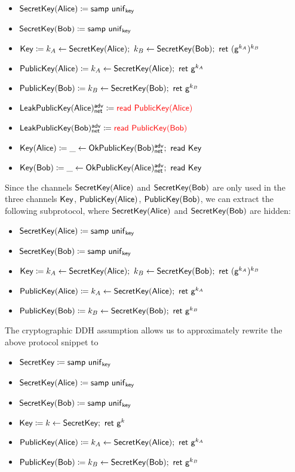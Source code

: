 \begin{itemize}
\item $\mathsf{SecretKey}(\mathsf{Alice}) \coloneqq \mathsf{samp} \ \mathsf{unif}_{\mathsf{key}}$
\item $\mathsf{SecretKey}(\mathsf{Bob}) \coloneqq \mathsf{samp} \ \mathsf{unif}_{\mathsf{key}}$
\item $\Key \coloneqq k_A \leftarrow \SecretKey(\Alice); \ k_B \leftarrow \SecretKey(\Bob); \ \ret{(\gen^{k_A})^{k_B}}$
\item {\color{red} $\PublicKey(\Alice) \coloneqq k_A \leftarrow \SecretKey(\Alice); \ \ret{\gen^{k_A}}$}
\item {\color{red} $\mathsf{PublicKey}(\mathsf{Bob}) \coloneqq k_B \leftarrow \mathsf{SecretKey}(\mathsf{Bob}); \ \mathsf{ret} \ \mathsf{g}^{k_B}$}
\item $\mathsf{LeakPublicKey}(\mathsf{Alice})^{\mathsf{adv}}_{\mathsf{net}} \coloneqq {\color{red} \mathsf{read} \ \mathsf{PublicKey}(\mathsf{Alice})}$
\item $\mathsf{LeakPublicKey}(\mathsf{Bob})^{\mathsf{adv}}_{\mathsf{net}} \coloneqq {\color{red} \mathsf{read} \ \mathsf{PublicKey}(\mathsf{Bob})}$
\item $\mathsf{Key}(\mathsf{Alice}) \coloneqq \_ \leftarrow \mathsf{OkPublicKey}(\mathsf{Bob})^{\mathsf{adv}}_{\mathsf{net}}; \ \mathsf{read} \ \mathsf{Key}$
\item $\mathsf{Key}(\mathsf{Bob}) \coloneqq \_ \leftarrow \mathsf{OkPublicKey}(\mathsf{Alice})^{\mathsf{adv}}_{\mathsf{net}}; \ \mathsf{read} \ \mathsf{Key}$
\end{itemize}

\noindent Since the channels $\mathsf{SecretKey}(\mathsf{Alice})$ and $\mathsf{SecretKey}(\mathsf{Bob})$ are only used in the three channels $\mathsf{Key}$, $\mathsf{PublicKey}(\mathsf{Alice})$, $\mathsf{PublicKey}(\mathsf{Bob})$, we can extract the following subprotocol, where $\mathsf{SecretKey}(\mathsf{Alice})$ and $\mathsf{SecretKey}(\mathsf{Bob})$ are hidden:

\begin{itemize}
\item $\mathsf{SecretKey}(\mathsf{Alice}) \coloneqq \mathsf{samp} \ \mathsf{unif}_{\mathsf{key}}$
\item $\mathsf{SecretKey}(\mathsf{Bob}) \coloneqq \mathsf{samp} \ \mathsf{unif}_{\mathsf{key}}$
\item $\Key \coloneqq k_A \leftarrow \SecretKey(\Alice); \ k_B \leftarrow \SecretKey(\Bob); \ \ret{(\gen^{k_A})^{k_B}}$
\item $\PublicKey(\Alice) \coloneqq k_A \leftarrow \SecretKey(\Alice); \ \ret{\gen^{k_A}}$
\item $\mathsf{PublicKey}(\mathsf{Bob}) \coloneqq k_B \leftarrow \mathsf{SecretKey}(\mathsf{Bob}); \ \mathsf{ret} \ \mathsf{g}^{k_B}$
\end{itemize}

\noindent The cryptographic DDH assumption allows us to approximately rewrite the above protocol snippet to

\begin{itemize}
\item $\mathsf{SecretKey} \coloneqq \mathsf{samp} \ \mathsf{unif}_{\mathsf{key}}$
\item $\mathsf{SecretKey}(\mathsf{Alice}) \coloneqq \mathsf{samp} \ \mathsf{unif}_{\mathsf{key}}$
\item $\mathsf{SecretKey}(\mathsf{Bob}) \coloneqq \mathsf{samp} \ \mathsf{unif}_{\mathsf{key}}$
\item $\mathsf{Key} \coloneqq k \leftarrow \mathsf{SecretKey}; \ \mathsf{ret} \ \mathsf{g}^k$
\item $\PublicKey(\Alice) \coloneqq k_A \leftarrow \SecretKey(\Alice); \ \ret{\gen^{k_A}}$
\item $\mathsf{PublicKey}(\mathsf{Bob}) \coloneqq k_B \leftarrow \mathsf{SecretKey}(\mathsf{Bob}); \ \mathsf{ret} \ \mathsf{g}^{k_B}$
\end{itemize}

